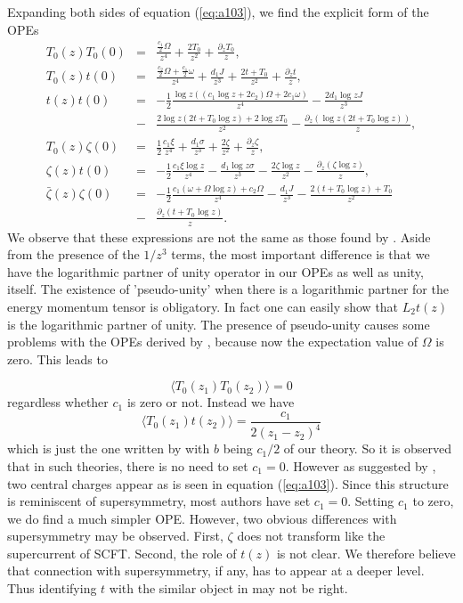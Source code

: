 \documentclass[a4paper,11pt]{article}
\begin{document}
Expanding both sides of equation (\ref{eq:a103}), we find the
explicit form of the OPEs
\begin{eqnarray}\label{eq:a104}
T_0(z)T_0(0)&=& \frac{ \frac{c_1}{2} \Omega}{z^{4}}+
\frac{2T_0}{z^{2}}+ \frac{\partial_z T_0}{z}, \nonumber \\
T_0(z)t(0)&=&\frac{ \frac{c_2}{2} \Omega+
\frac{c_1}{2}\omega}{z^{4}} + \frac{d_1 J}{z^3} + \frac{2t +
T_0}{z^{2}} + \frac{
\partial_z t}{z},\nonumber\\
t(z)t(0)&=&-\frac{1}{2} \frac{ \log{z}\left((c_1 \log{z} +
2c_2)\Omega + 2c_1 \omega\right)}{z^{4}} -\frac{2d_1 \log{z}
J}{z^3}
\nonumber \\
&-&\frac{ 2 \log{z}(2t +T_0 \log{z}) + 2 \log{z}
T_0}{z^{2}}-\frac{
\partial_z( \log{z}
(2t + T_0 \log{z}))}{z},\nonumber \\
T_0(z)\zeta(0)&=&\frac{1}{2} \frac{c_1 \xi}{z^{4}} + \frac{d_1
\sigma}{z^3}+\frac{2
\zeta}{z^{2}}+\frac{\partial_z \zeta}{z},\nonumber\\
\zeta(z)t(0)&=&-\frac{1}{2} \frac{c_1 \xi \log{z}}{ z^{4}}
-\frac{d_1 \log{z} \sigma}{z^3}- \frac{2\zeta\log{z}}{z^{2}}-
\frac{\partial_z (\zeta \log{z})}{z},\nonumber\\
 \bar{\zeta}(z) \zeta(0)&=&-\frac{1}{2} \frac{ c_1 (\omega +
\Omega \log{z}) + c_2\Omega}{z^{4}}-\frac{d_1 J}{z^3}-\frac{2(t +
T_0 \log{z}) + T_0}{z^{2}}\nonumber\\
&-&\frac{\partial_z( t + T_0 \log{z})}{z}.
\end{eqnarray}
We observe that these expressions are not the same as those found
by \cite{lud}. Aside from the presence of the $1/z^3$ terms, the
most important difference is that we have the logarithmic partner
of unity operator in our OPEs as well as unity, itself. The
existence of 'pseudo-unity' when there is a logarithmic partner
for the energy momentum tensor is obligatory. In fact one can
easily show that $L_{2}t(z)$ is the logarithmic partner of unity.
The presence of pseudo-unity causes some problems with the OPEs
derived by \cite{lud}, because now the expectation value of
$\Omega$ is zero. This leads to

\begin{equation}\label{eq:a110}
\langle T_0(z_1)T_0(z_2) \rangle =0
\end{equation}
regardless whether $c_1$ is zero or not. Instead we have
\begin{equation}\label{eq:a111}
\langle T_0(z_1)t(z_2)\rangle = \frac{c_1}{2(z_1-z_2)^4}
\end{equation}
which is just the one written by \cite{lud} with $b$ being $c_1/2$
of our theory. So it is observed that in such theories, there is
no need to set $c_1=0$. However as suggested by \cite{lud}, two
central charges appear as is seen in equation (\ref{eq:a103}).
Since this structure is reminiscent of supersymmetry, most
authors have set $c_1=0$. Setting $c_1$ to zero, we do find a
much simpler OPE. However, two obvious differences with
supersymmetry may be observed. First, $\zeta$ does not transform
like the supercurrent of SCFT. Second, the role of $t(z)$ is not
clear. We therefore believe that connection with supersymmetry,
if any, has to appear at a deeper level. Thus identifying $t$
with the similar object in \cite{lud} may not be right.
\end{document}

